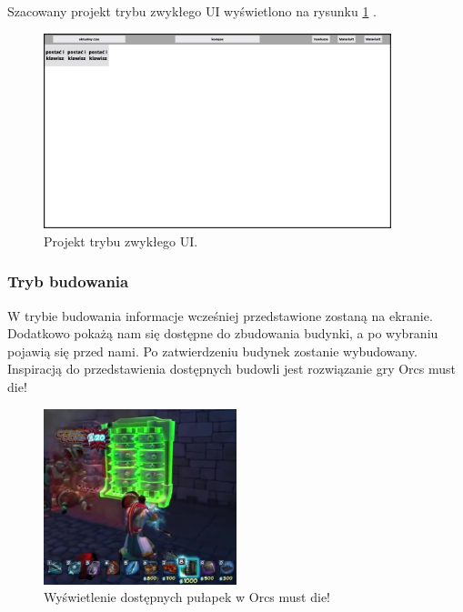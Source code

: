 Szacowany projekt trybu zwykłego UI wyświetlono na rysunku \ref{fig:ui_main} .
\begin{figure}[htbp]
    \centering
    \includegraphics[width=0.9\textwidth]{images/ui/ui_proj_ogolne.jpg}
    \caption{Projekt trybu zwykłego UI.
    }\label{fig:ui_main}
\end{figure}
 
\subsubsection{Tryb budowania}
 W trybie budowania informacje wcześniej przedstawione zostaną na ekranie. Dodatkowo pokażą nam się dostępne do zbudowania budynki, a po wybraniu pojawią się przed nami. Po zatwierdzeniu budynek zostanie wybudowany.
	Inspiracją do przedstawienia dostępnych budowli jest rozwiązanie gry Orcs must die!

    \begin{figure}[h!tbp]
        \centering
        \includegraphics[width=0.5\textwidth]{images/ui/buoildingsOrcs.png}
        \caption{Wyświetlenie dostępnych pułapek w Orcs must die!}\label{fig:Orcs}
    \end{figure}

